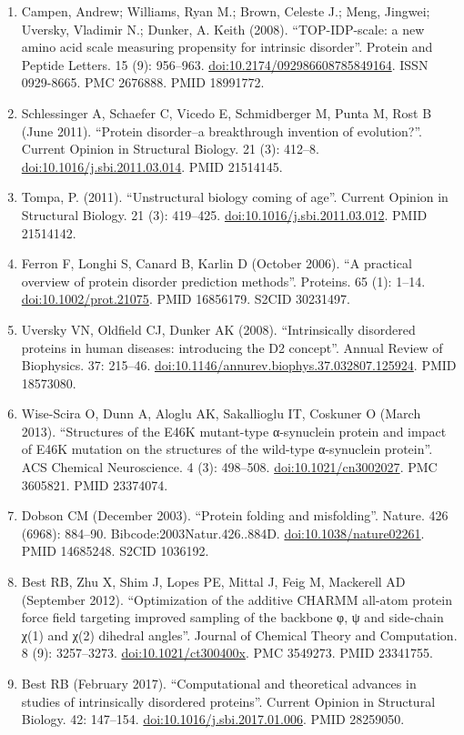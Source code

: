 \documentclass[
]{book}
\begin{document}
\begin{enumerate}
\item
  Campen, Andrew; Williams, Ryan M.; Brown, Celeste J.; Meng, Jingwei; Uversky, Vladimir N.; Dunker, A. Keith (2008). ``TOP-IDP-scale: a new amino acid scale measuring propensity for intrinsic disorder''. Protein and Peptide Letters. 15 (9): 956--963. \url{doi:10.2174/092986608785849164}. ISSN 0929-8665. PMC 2676888. PMID 18991772.
\item
  Schlessinger A, Schaefer C, Vicedo E, Schmidberger M, Punta M, Rost B (June 2011). ``Protein disorder--a breakthrough invention of evolution?''. Current Opinion in Structural Biology. 21 (3): 412--8. \url{doi:10.1016/j.sbi.2011.03.014}. PMID 21514145.
\item
  Tompa, P. (2011). ``Unstructural biology coming of age''. Current Opinion in Structural Biology. 21 (3): 419--425. \url{doi:10.1016/j.sbi.2011.03.012}. PMID 21514142.
\item
  Ferron F, Longhi S, Canard B, Karlin D (October 2006). ``A practical overview of protein disorder prediction methods''. Proteins. 65 (1): 1--14. \url{doi:10.1002/prot.21075}. PMID 16856179. S2CID 30231497.
\item
  Uversky VN, Oldfield CJ, Dunker AK (2008). ``Intrinsically disordered proteins in human diseases: introducing the D2 concept''. Annual Review of Biophysics. 37: 215--46. \url{doi:10.1146/annurev.biophys.37.032807.125924}. PMID 18573080.
\item
  Wise-Scira O, Dunn A, Aloglu AK, Sakallioglu IT, Coskuner O (March 2013). ``Structures of the E46K mutant-type α-synuclein protein and impact of E46K mutation on the structures of the wild-type α-synuclein protein''. ACS Chemical Neuroscience. 4 (3): 498--508. \url{doi:10.1021/cn3002027}. PMC 3605821. PMID 23374074.
\item
  Dobson CM (December 2003). ``Protein folding and misfolding''. Nature. 426 (6968): 884--90. Bibcode:2003Natur.426..884D. \url{doi:10.1038/nature02261}. PMID 14685248. S2CID 1036192.
\item
  Best RB, Zhu X, Shim J, Lopes PE, Mittal J, Feig M, Mackerell AD (September 2012). ``Optimization of the additive CHARMM all-atom protein force field targeting improved sampling of the backbone φ, ψ and side-chain χ(1) and χ(2) dihedral angles''. Journal of Chemical Theory and Computation. 8 (9): 3257--3273. \url{doi:10.1021/ct300400x}. PMC 3549273. PMID 23341755.
\item
  Best RB (February 2017). ``Computational and theoretical advances in studies of intrinsically disordered proteins''. Current Opinion in Structural Biology. 42: 147--154. \url{doi:10.1016/j.sbi.2017.01.006}. PMID 28259050.

\end{enumerate}
\end{document}

